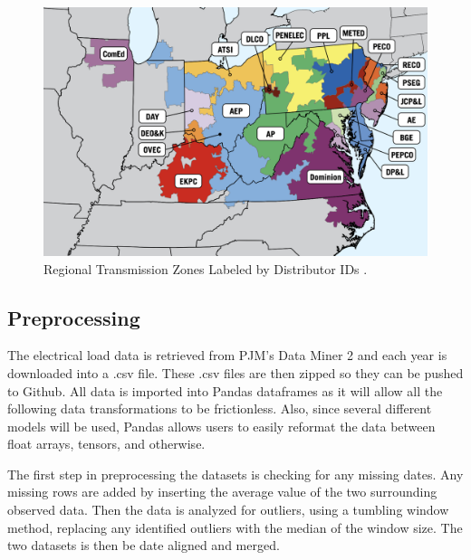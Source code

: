 \documentclass[sigconf]{acmart}
\begin{document}
  \begin{figure}
    \includegraphics[width=\columnwidth]{Images/Zones.png}
    \caption{Regional Transmission Zones Labeled by Distributor IDs \protect \cite{PJM24}.}
    \Description{}
    \label{fig:zone}
  \end{figure}

  \subsection{Preprocessing}
  The electrical load data is retrieved from PJM's Data Miner 2 and each year is downloaded into a .csv file. These .csv files are then zipped so they can be pushed to Github. All data is imported into Pandas dataframes as it will allow all the following data transformations to be frictionless. Also, since several different models will be used, Pandas allows users to easily reformat the data between float arrays, tensors, and otherwise.
  
  The first step in preprocessing the datasets is checking for any missing dates. Any missing rows are added by inserting the average value of the two surrounding observed data. Then the data is analyzed for outliers, using a tumbling window method, replacing any identified outliers with the median of the window size. The two datasets is then be date aligned and merged.
  
\end{document}
